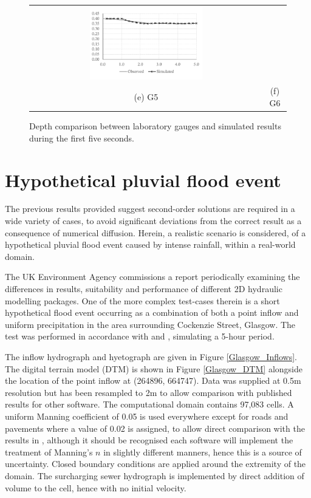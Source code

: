 \begin{figure}[tpb]
\begin{tabular}{cc}
		\includegraphics[width=0.5\textwidth]{numerical-test-figures/dam-break-obstacle-results-g6.pdf} \\
		(e) G5 &
		(f) G6 \\
	\end{tabular}
	\caption{Depth comparison between laboratory gauges and simulated results during the first five seconds.}
	\label{TestResult_DamObstacle_Gauges}
\end{figure}

\section{Hypothetical pluvial flood event}

The previous results provided suggest second-order solutions are required in a wide variety of cases, to avoid significant deviations from the correct result as a consequence of numerical diffusion. Herein, a realistic scenario is considered, of a hypothetical pluvial flood event caused by intense rainfall, within a real-world domain.

The UK Environment Agency commissions a report periodically examining the differences in results, suitability and performance of different 2D hydraulic modelling packages. One of the more complex test-cases therein is a short hypothetical flood event occurring as a combination of both a point inflow and uniform precipitation in the area surrounding Cockenzie Street, Glasgow. The test was performed in accordance with \citet{Pender2010} and \citet{Pender2013}, simulating a 5-hour period.

The inflow hydrograph and hyetograph are given in Figure \ref{Glasgow_Inflows}. The digital terrain model (DTM) is shown in Figure \ref{Glasgow_DTM} alongside the location of the point inflow at (264896, 664747). Data was supplied at 0.5m resolution but has been resampled to 2m to allow comparison with published results for other software. The computational domain contains 97,083 cells. A uniform Manning coefficient of 0.05 is used everywhere except for roads and pavements where a value of 0.02 is assigned, to allow direct comparison with the results in \citet{Pender2010}, although it should be recognised each software will implement the treatment of Manning's $n$ in slightly different manners, hence this is a source of uncertainty. Closed boundary conditions are applied around the extremity of the domain. The surcharging sewer hydrograph is implemented by direct addition of volume to the cell, hence with no initial velocity.

